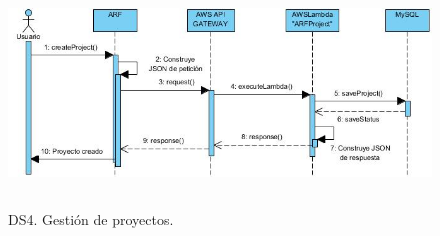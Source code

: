 
\begin{figure}[h!]
	\centering
	\includegraphics[width=14cm,height=6cm]{imagenes/analisis/ds/CreateProject.jpg}
	\caption{DS4. Gestión de proyectos.}
	\label{fig:dsreccuenta}
\end{figure}
\clearpage


